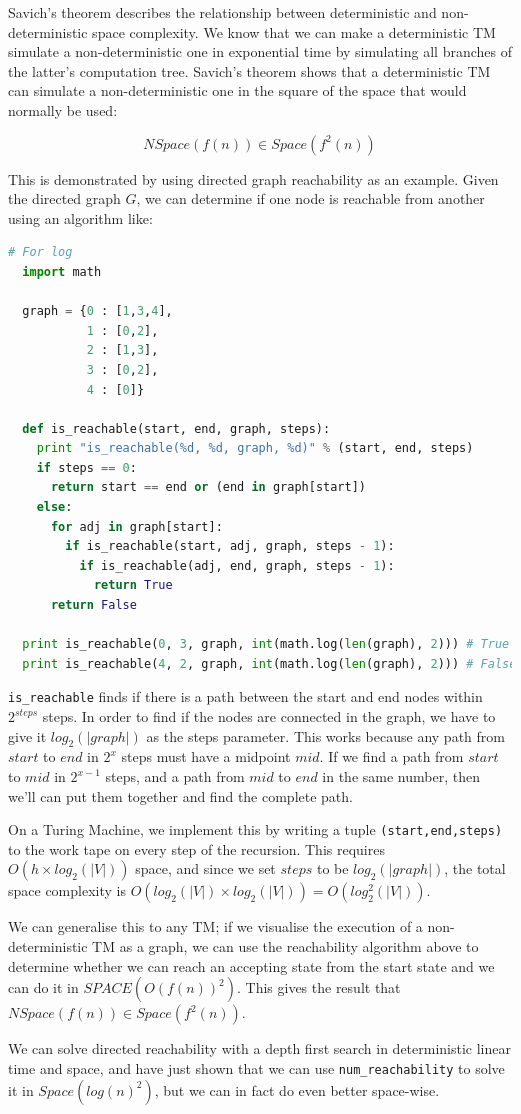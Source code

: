 Savich's theorem describes the relationship between deterministic and non-
deterministic space complexity. We know that we can make a deterministic TM
simulate a non-deterministic one in exponential time by simulating all branches
of the latter's computation tree. Savich's theorem shows that a deterministic TM
can simulate a non-deterministic one in the square of the space that would
normally be used:


\[
  NSpace(f(n)) \in Space(f^2(n))
\]

This is demonstrated by using directed graph reachability as an example. Given
the directed graph $G$, we can determine if one node is reachable from another
using an algorithm like:

\begin{lstlisting}[language=python]
  # For log
  import math

  graph = {0 : [1,3,4],
           1 : [0,2],
           2 : [1,3],
           3 : [0,2],
           4 : [0]}

  def is_reachable(start, end, graph, steps):
    print "is_reachable(%d, %d, graph, %d)" % (start, end, steps)
    if steps == 0:
      return start == end or (end in graph[start])
    else:
      for adj in graph[start]:
        if is_reachable(start, adj, graph, steps - 1):
          if is_reachable(adj, end, graph, steps - 1):
            return True
      return False

  print is_reachable(0, 3, graph, int(math.log(len(graph), 2))) # True
  print is_reachable(4, 2, graph, int(math.log(len(graph), 2))) # False
\end{lstlisting}

\texttt{is\_reachable} finds if there is a path between the start and end nodes
within $2^{steps}$ steps. In order to find if the nodes are connected in the
graph, we have to give it $log_2(|graph|)$ as the steps parameter. This works
because any path from $start$ to $end$ in $2^x$ steps must have a midpoint
$mid$. If we find a path from $start$ to $mid$ in $2^{x - 1}$ steps, and a path
from $mid$ to $end$ in the same number, then we'll can put them together and
find the complete path.

On a Turing Machine, we implement this by writing a tuple
\texttt{(start,end,steps)} to the work tape on every step of the recursion. This
requires $O(h \times log_2(|V|))$ space, and since we set $steps$ to be $log_2
(|graph|)$, the total space complexity is $O(log_2(|V|) \times log_2(|V|)) = O(
log^2_2(|V|))$.

We can generalise this to any TM; if we visualise the execution of a non-
deterministic TM as a graph, we can use the reachability algorithm above to
determine whether we can reach an accepting state from the start state and we
can do it in $SPACE(O(f(n))^2)$. This gives the result that $NSpace(f(n)) \in
Space(f^2(n))$.

We can solve directed reachability with a depth first search in deterministic
linear time and space, and have just shown that we can use
\texttt{num\_reachability} to solve it in $Space(log(n)^2)$, but we can in fact
do even better space-wise.
